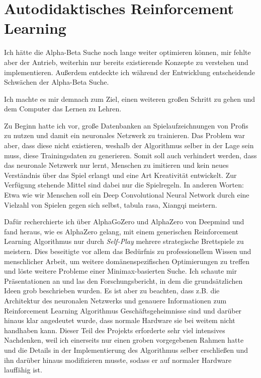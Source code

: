 \documentclass[
  manuscript=article,  %
  layout=publish,  %
  year=2023,
  volume=1,
]{extra/joas}
\begin{document}
\section{Autodidaktisches Reinforcement Learning}
Ich hätte die Alpha-Beta Suche noch lange weiter optimieren können, mir fehlte aber der Antrieb, weiterhin nur bereits existierende Konzepte zu verstehen und implementieren. Außerdem entdeckte ich während der Entwicklung entscheidende Schwächen der Alpha-Beta Suche.

Ich machte es mir demnach zum Ziel, einen weiteren großen Schritt zu gehen und dem Computer das Lernen zu Lehren. 

Zu Beginn hatte ich vor, große Datenbanken an Spielaufzeichnungen von Profis zu nutzen und damit ein neuronales Netzwerk zu trainieren. Das Problem war aber, dass diese nicht existieren, weshalb der Algorithmus selber in der Lage sein muss, diese Trainingsdaten zu generieren. Somit soll auch verhindert werden, dass das neuronale Netzwerk nur lernt, Menschen zu imitieren und kein neues Verständnis über das Spiel erlangt und eine Art Kreativität entwickelt. Zur Verfügung stehende Mittel sind dabei nur die Spielregeln. In anderen Worten: Etwa wie wir Menschen soll ein Deep Convolutional Neural Network durch eine Vielzahl von Spielen gegen sich selbst, tabula rasa, Xiangqi meistern. 

Dafür recherchierte ich über AlphaGoZero \cite{ag0} und AlphaZero \cite{a0} von Deepmind und fand heraus, wie es AlphaZero gelang, mit einem generischen Reinforcement Learning Algorithmus nur durch \textit{Self-Play} mehrere strategische Brettspiele zu meistern. Dies beseitigte vor allem das Bedürfnis zu professionellem Wissen und menschlicher Arbeit, um weitere domänenspezifischen Optimierungen zu treffen und löste weitere Probleme einer Minimax-basierten Suche.
Ich schaute mir Präsentationen an und  las den Forschungsbericht, in dem die grundsätzlichen Ideen grob beschrieben wurden. Es ist aber zu beachten, dass z.B. die Architektur des neuronalen Netzwerks und genauere Informationen zum Reinforcement Learning Algorithmus Geschäftsgeheimnisse sind und darüber hinaus klar angedeutet wurde, dass normale Hardware sie bei weitem nicht handhaben kann. Dieser Teil des Projekts erforderte sehr viel intensives Nachdenken, weil ich einerseits nur einen groben vorgegebenen Rahmen hatte und die Details in der Implementierung des Algorithmus selber erschließen und ihn darüber hinaus modifizieren musste, sodass er auf normaler Hardware lauffähig ist.
\end{document}
